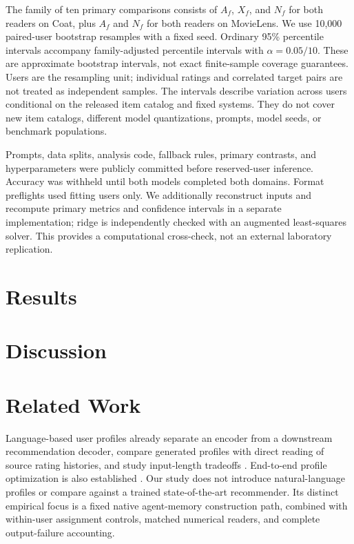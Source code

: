 \documentclass{article}
\begin{document}
The family of ten primary comparisons consists of $A_f$, $X_f$, and $N_f$ for both readers on Coat, plus $A_f$ and $N_f$ for both readers on MovieLens. We use 10,000 paired-user bootstrap resamples with a fixed seed. Ordinary 95\% percentile intervals accompany family-adjusted percentile intervals with $\alpha=0.05/10$. These are approximate bootstrap intervals, not exact finite-sample coverage guarantees. Users are the resampling unit; individual ratings and correlated target pairs are not treated as independent samples. The intervals describe variation across users conditional on the released item catalog and fixed systems. They do not cover new item catalogs, different model quantizations, prompts, model seeds, or benchmark populations.

Prompts, data splits, analysis code, fallback rules, primary contrasts, and hyperparameters were publicly committed before reserved-user inference. Accuracy was withheld until both models completed both domains. Format preflights used fitting users only. We additionally reconstruct inputs and recompute primary metrics and confidence intervals in a separate implementation; ridge is independently checked with an augmented least-squares solver. This provides a computational cross-check, not an external laboratory replication.

\section{Results}


\section{Discussion}


\section{Related Work}
Language-based user profiles already separate an encoder from a downstream recommendation decoder, compare generated profiles with direct reading of source rating histories, and study input-length tradeoffs \citep{zhou2024language}. End-to-end profile optimization is also established \citep{gao2025langptune}. Our study does not introduce natural-language profiles or compare against a trained state-of-the-art recommender. Its distinct empirical focus is a fixed native agent-memory construction path, combined with within-user assignment controls, matched numerical readers, and complete output-failure accounting.
\end{document}
